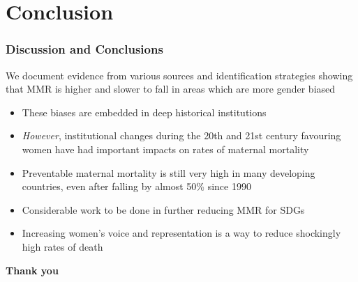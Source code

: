 \documentclass[10pt,letterpaper,subeqn]{beamer}
\begin{document}
\section{Conclusion}
\begin{frame}
\frametitle{Discussion and Conclusions}
We document evidence from various sources and identification strategies showing
that MMR is higher and slower to fall in areas which are more gender biased
\vspace{3mm}
\begin{itemize}
  \setlength{\itemsep}{10pt}
  \item These biases are embedded in deep historical institutions
  \item \emph{However}, institutional changes during the 20th and 21st century
    favouring women have had important impacts on rates of maternal mortality
  \item Preventable maternal mortality is still very high in many developing 
    countries, even after falling by almost 50\% since 1990
  \item Considerable work to be done in further reducing MMR for SDGs
  \item Increasing women's voice and representation is a way to reduce shockingly
    high rates of death
\end{itemize}
\end{frame}

\begin{frame}[plain]
\begin{center}
\textbf{Thank you}
\end{center}
\end{frame}


\setcounter{table}{0}
\renewcommand{\thetable}{A\arabic{table}}
\setcounter{figure}{0}
\renewcommand{\thefigure}{A\arabic{figure}}
\end{document}
